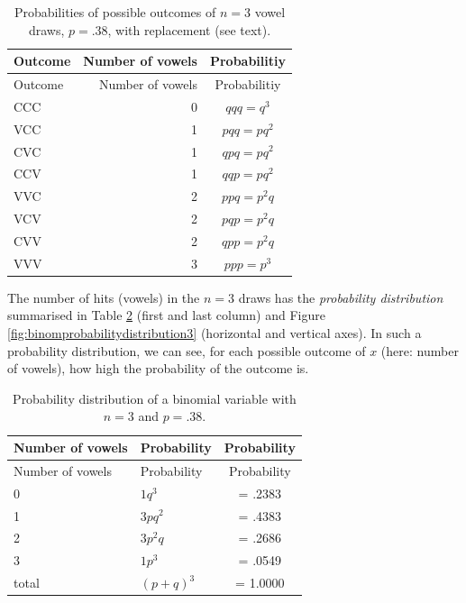 \documentclass[
]{book}
\begin{document}
\begin{longtable}[]{@{}lrc@{}}
\caption{\label{tab:vowelprobabilities} Probabilities of possible outcomes of \(n=3\)
vowel draws, \(p=.38\), with replacement (see text).}\tabularnewline
\toprule
Outcome & Number of vowels & Probabilitiy\tabularnewline
\midrule
\endfirsthead
\toprule
Outcome & Number of vowels & Probabilitiy\tabularnewline
\midrule
\endhead
CCC & 0 & \(qqq = q^3\)\tabularnewline
VCC & 1 & \(pqq = pq^2\)\tabularnewline
CVC & 1 & \(qpq = pq^2\)\tabularnewline
CCV & 1 & \(qqp = pq^2\)\tabularnewline
VVC & 2 & \(ppq = p^2q\)\tabularnewline
VCV & 2 & \(pqp = p^2q\)\tabularnewline
CVV & 2 & \(qpp = p^2q\)\tabularnewline
VVV & 3 & \(ppp = p^3\)\tabularnewline
\bottomrule
\end{longtable}

The number of hits (vowels) in the \(n=3\) draws has the
\emph{probability distribution} summarised in
Table \ref{tab:binomprobabilitydistribution3} (first and last column) and
Figure \ref{fig:binomprobabilitydistribution3} (horizontal and vertical axes).
In such a probability distribution, we can see, for each possible outcome of \(x\)
(here: number of vowels), how high the probability of the outcome is.

\begin{longtable}[]{@{}llc@{}}
\caption{\label{tab:binomprobabilitydistribution3} Probability distribution of a
binomial variable with \(n=3\) and \(p=.38\).}\tabularnewline
\toprule
Number of vowels & Probability & Probability\tabularnewline
\midrule
\endfirsthead
\toprule
Number of vowels & Probability & Probability\tabularnewline
\midrule
\endhead
0 & \(1 q^3\) & = .2383\tabularnewline
1 & \(3 p q^2\) & = .4383\tabularnewline
2 & \(3 p^2 q\) & = .2686\tabularnewline
3 & \(1 p^3\) & = .0549\tabularnewline
total & \((p+q)^3\) & = 1.0000\tabularnewline
\bottomrule
\end{longtable}
\end{document}
